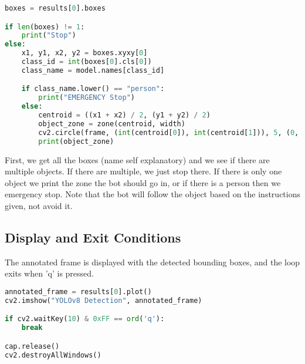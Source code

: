 \documentclass[12pt]{article}
\begin{document}
\begin{lstlisting}[language=Python]
boxes = results[0].boxes

if len(boxes) != 1:
    print("Stop")
else:
    x1, y1, x2, y2 = boxes.xyxy[0]
    class_id = int(boxes[0].cls[0])
    class_name = model.names[class_id]

    if class_name.lower() == "person":
        print("EMERGENCY Stop")
    else:
        centroid = ((x1 + x2) / 2, (y1 + y2) / 2)
        object_zone = zone(centroid, width)
        cv2.circle(frame, (int(centroid[0]), int(centroid[1])), 5, (0, 0, 255), -1)
        print(object_zone)
\end{lstlisting}

First, we get all the boxes (name self explanatory) and we see if there are multiple objects. If there are multiple, we just stop there. If there is only one object we print the zone the bot should go in, or if there is a person then we emergency stop. 
\newline\newline
Note that the bot will follow the object based on the instructions given, not avoid it.

\subsection*{Display and Exit Conditions}
The annotated frame is displayed with the detected bounding boxes, and the loop exits when 'q' is pressed.

\begin{lstlisting}[language=Python]
annotated_frame = results[0].plot()
cv2.imshow("YOLOv8 Detection", annotated_frame)

if cv2.waitKey(10) & 0xFF == ord('q'):
    break

cap.release()
cv2.destroyAllWindows()
\end{lstlisting}
\end{document}
